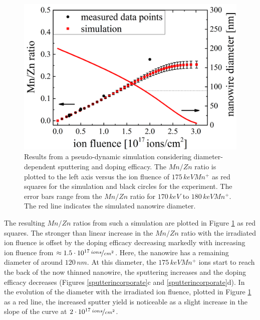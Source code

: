 \begin{figure}[h]
	\centering
		\includegraphics[width=.7\textwidth]{images/pseudodynamic.png}
	\caption{Results from a pseudo-dynamic simulation considering diameter-dependent sputtering and doping efficacy. The $Mn/Zn$ ratio is plotted to the left axis versus the ion fluence of $175\,keV Mn^+$ as red squares for the simulation and black circles for the experiment. The error bars range from the $Mn/Zn$ ratio for $170\,keV$ to $180\,keV Mn^+$. The red line indicates the simulated nanowire diameter.}
	\label{pseudodynamic}
\end{figure} 

The resulting $Mn/Zn$ ratios from such a simulation are plotted in Figure \ref{pseudodynamic} as red squares. The stronger than linear increase in the $Mn/Zn$ ratio with the irradiated ion fluence is offset by the doping efficacy decreasing markedly with increasing ion fluence from $\approx 1.5\cdot 10^{17}\,\nicefrac{ions}{cm^2}$. Here, the nanowire has a remaining diameter of around $120\,nm$. At this diameter, the $175\,keV Mn^+$ ions start to reach the back of the now thinned nanowire, the sputtering increases and the doping efficacy decreases (Figures \ref{sputterincorporate}c and \ref{sputterincorporate}d). In the evolution of the diameter with the irradiated ion fluence, plotted in Figure \ref{pseudodynamic} as a red line, the increased sputter yield is noticeable as a slight increase in the slope of the curve at $2\cdot 10^{17}\,\nicefrac{ions}{cm^2}$. 

